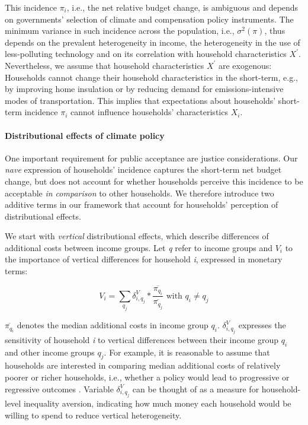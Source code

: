 \documentclass[12pt, a4paper]{article}
\begin{document}
This incidence $\pi_{i}$, i.e., the net relative budget change, is ambiguous and depends on governments' selection of climate and compensation policy instruments. The minimum variance in such incidence across the population, i.e., $\sigma^{2}(\pi)$, thus depends on the prevalent heterogeneity in income, the heterogeneity in the use of less-polluting technology and on its correlation with household characteristics $X^{\prime}$. Nevertheless, we assume that household characteristics $X^{\prime}$ are exogenous: Households cannot change their household characteristics in the short-term, e.g., by improving home insulation or by reducing demand for emissions-intensive modes of transportation. This implies that expectations about households' short-term incidence $\pi_{i}$ cannot influence households' characteristics $X_{i}$.

\paragraph{Distributional effects of climate policy}
One important requirement for public acceptance are justice considerations. Our \textit{nave} expression of households' incidence captures the short-term net budget change, but does not account for whether households perceive this incidence to be acceptable \textit{in comparison} to other households. We therefore introduce two additive terms in our framework that account for households' perception of distributional effects. 

We start with \textit{vertical} distributional effects, which describe differences of additional costs between income groups. Let \textit{q} refer to income groups and $V_{i}$ to the importance of vertical differences for household \textit{i}, expressed in monetary terms:

\begin{equation}
    V_{i} = \sum_{q_{j}} \delta_{i,q_{j}}^{V} * \frac{\overline{\pi_{q_{i}}}}{\overline{\pi_{q_{j}}}} \text{ with } q_{i} \neq q_{j}  
\end{equation}

$\overline{\pi_{q_{i}}}$ denotes the median additional costs in income group $q_{i}$. $\delta_{i,q_{j}}^{V}$ expresses the sensitivity of household \textit{i} to vertical differences between their income group $q_{i}$ and other income groups $q_{j}$. For example, it is reasonable to assume that households are interested in comparing median additional costs of relatively poorer or richer households, i.e., whether a policy would lead to progressive or regressive outcomes \autocite[e.g.,][]{Dechezlepretre.2022}. Variable $\delta_{i,q_{j}}^{V}$ can be thought of as a measure for household-level inequality aversion, indicating how much money each household would be willing to spend to reduce vertical heterogeneity.
\end{document}
